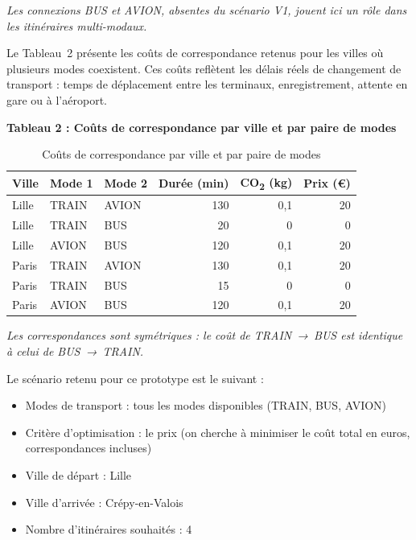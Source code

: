 \documentclass[fontsize=10pt,oneside,parskip=half]{scrreprt}
\begin{document}
{\small\itshape Les connexions BUS et AVION, absentes du scénario V1, jouent ici un
rôle dans les itinéraires multi-modaux.}

Le Tableau~2 présente les coûts de correspondance retenus pour les villes où plusieurs
modes coexistent. Ces coûts reflètent les délais réels de changement de transport :
temps de déplacement entre les terminaux, enregistrement, attente en gare ou à
l'aéroport.

\noindent\textbf{Tableau 2 : Coûts de correspondance par ville et par paire de modes}

\begin{table}[H]
  \centering
  \begin{tabular}{lllrrr}
    \toprule
    \textbf{Ville} & \textbf{Mode 1} & \textbf{Mode 2}
      & \textbf{Durée (min)} & \textbf{CO\textsubscript{2} (kg)} & \textbf{Prix (€)} \\
    \midrule
    Lille  & TRAIN & AVION & 130 & 0{,}1 & 20 \\
    Lille  & TRAIN & BUS   & 20  & 0     & 0  \\
    Lille  & AVION & BUS   & 120 & 0{,}1 & 20 \\
    Paris  & TRAIN & AVION & 130 & 0{,}1 & 20 \\
    Paris  & TRAIN & BUS   & 15  & 0     & 0  \\
    Paris  & AVION & BUS   & 120 & 0{,}1 & 20 \\
    \bottomrule
  \end{tabular}
  \caption{Coûts de correspondance par ville et par paire de modes}
\end{table}

{\small\itshape Les correspondances sont symétriques : le coût de TRAIN~→~BUS est
identique à celui de BUS~→~TRAIN.}

Le scénario retenu pour ce prototype est le suivant :

\begin{itemize}
  \item Modes de transport : tous les modes disponibles (TRAIN, BUS, AVION)
  \item Critère d'optimisation : le prix (on cherche à minimiser le coût total en
        euros, correspondances incluses)
  \item Ville de départ : Lille
  \item Ville d'arrivée : Crépy-en-Valois
  \item Nombre d'itinéraires souhaités : 4
\end{itemize}
\end{document}
